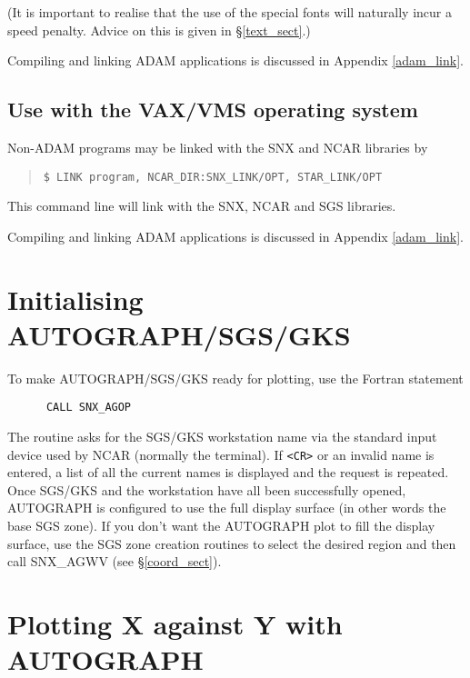 (It is important to realise that the use of the special fonts will naturally
incur a speed penalty.  Advice on this is given in \S\ref{text_sect}.)

Compiling and linking ADAM applications is discussed in Appendix
\ref{adam_link}.

\subsection {Use with the VAX/VMS operating system}

Non-ADAM programs may be linked with the SNX and NCAR libraries by

\begin{quote}
\begin{verbatim}
$ LINK program, NCAR_DIR:SNX_LINK/OPT, STAR_LINK/OPT
\end{verbatim}
\end{quote}

This command line will link with the SNX, NCAR and SGS libraries.

Compiling and linking ADAM applications is discussed in Appendix
\ref{adam_link}.

\section {Initialising AUTOGRAPH/SGS/GKS}

To make AUTOGRAPH/SGS/GKS ready for plotting, use the Fortran statement

\begin{verbatim}
      CALL SNX_AGOP
\end{verbatim}

The routine asks for the SGS/GKS workstation name via the standard input device
used by NCAR (normally the terminal).
If \verb+<CR>+ or an invalid name is entered, a list of all the current names
is displayed and the request is repeated.
Once SGS/GKS and the workstation have all been successfully opened,
AUTOGRAPH is configured to use the full display surface (in other words
the base SGS zone).
If you don't want the AUTOGRAPH plot to fill the display surface, use the SGS
zone creation routines to select the desired region and then call SNX\_AGWV
(see \S\ref{coord_sect}).


\section {Plotting X against Y with AUTOGRAPH}

